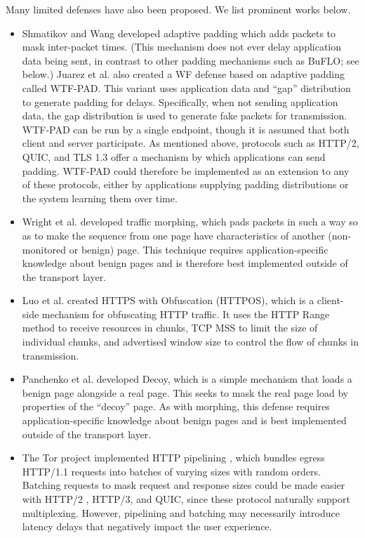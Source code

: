 \documentclass[runningheads]{llncs}
\begin{document}
Many limited defenses have also been proposed. We list prominent works below.
%
\begin{itemize}
\item Shmatikov and Wang \cite{shmatikov2006timing} developed adaptive padding which adds packets to mask
inter-packet times. (This mechanism does not ever delay application data being sent, in contrast to other
padding mechanisms such as BuFLO; see below.)
Juarez et al. \cite{juarez2016toward} also created a WF defense based on adaptive padding called WTF-PAD.
This variant uses application data and ``gap'' distribution to generate padding for delays. Specifically, when
not sending application data, the gap distribution is used to generate fake packets for transmission.
WTF-PAD can be run by a single endpoint, though it is assumed that both client and server participate.
As mentioned above, protocols such as HTTP/2, QUIC, and TLS 1.3 offer a mechanism by which applications can
send padding. WTF-PAD could therefore be implemented as an extension to any of these protocols, either by
applications supplying padding distributions or the system learning them over time.

\item Wright et al. \cite{wright2009traffic} developed traffic morphing, which pads packets in such a way
so as to make the sequence from one page have characteristics of another (non-monitored or benign) page.
This technique requires application-specific knowledge about benign pages and is therefore best implemented
outside of the transport layer.

\item Luo et al. \cite{luo2011httpos} created HTTPS with Obfuscation (HTTPOS), which is a client-side
mechanism for obfuscating HTTP traffic. It uses the HTTP Range method to receive resources in chunks, TCP
MSS to limit the size of individual chunks, and advertised window size to control the flow of chunks
in transmission.

\item Panchenko et al. \cite{panchenko2011website} developed Decoy, which is a simple mechanism that loads
a benign page alongside a real page. This seeks to mask the real page load by properties of the ``decoy'' page.
As with morphing, this defense requires application-specific knowledge about benign pages and is best
implemented outside of the transport layer.

\item The Tor project implemented HTTP pipelining \cite{perry2011experimental}, which bundles egress HTTP/1.1
requests into batches of varying sizes with random orders. Batching requests to mask request and response sizes
could be made easier with HTTP/2 \cite{rfc7540}, HTTP/3, and QUIC, since these protocol naturally support
multiplexing. However, pipelining and batching may necessarily introduce latency delays that negatively impact
the user experience.


\end{itemize}
\end{document}
